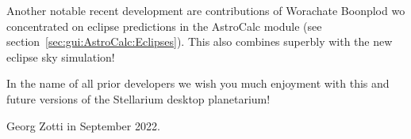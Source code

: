 Another notable recent development are contributions of Worachate
Boonplod wo concentrated on eclipse predictions in the AstroCalc
module (see section~\ref{sec:gui:AstroCalc:Eclipses}).  This also
combines superbly with the new eclipse sky simulation!

\vspace{2\baselineskip}



In the name of all prior developers we wish you much enjoyment with
this and future versions of the Stellarium desktop planetarium!


\vspace{2\baselineskip}

Georg Zotti in September 2022.

\vspace{2\baselineskip}



